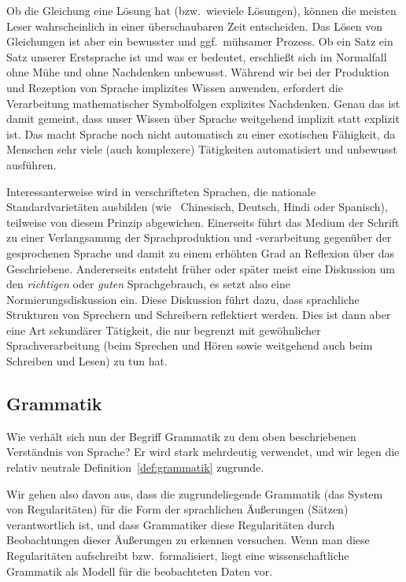 Ob die Gleichung eine Lösung hat (bzw.\ wieviele Lösungen), können die meisten Leser wahrscheinlich in einer überschaubaren Zeit entscheiden.
Das Lösen von Gleichungen ist aber ein bewusster und ggf.\ mühsamer Prozess.
Ob ein Satz ein Satz unserer Erstsprache ist und was er bedeutet, erschließt sich im Normalfall ohne Mühe und ohne Nachdenken unbewusst.
Während wir bei der Produktion und Rezeption von Sprache implizites Wissen anwenden, erfordert die Verarbeitung mathematischer Symbolfolgen explizites Nachdenken.
Genau das ist damit gemeint, dass unser Wissen über Sprache weitgehend implizit statt explizit ist.
Das macht Sprache noch nicht automatisch zu einer exotischen Fähigkeit, da Menschen sehr viele (auch komplexere) Tätigkeiten automatisiert und unbewusst ausführen.

Interessanterweise wird in verschrifteten Sprachen, die nationale Standardvarietäten ausbilden (wie \zB\ Chinesisch, Deutsch, Hindi oder Spanisch), teilweise von diesem Prinzip abgewichen. 
Einerseits führt das Medium der Schrift zu einer Verlangsamung der Sprachproduktion und -verarbeitung gegenüber der gesprochenen Sprache und damit zu einem erhöhten Grad an Reflexion über das Geschriebene.
Andererseits entsteht früher oder später meist eine Diskussion um den \textit{richtigen} oder \textit{guten} Sprachgebrauch, es setzt also eine Normierungsdiskussion ein. 
Diese Diskussion führt dazu, dass sprachliche Strukturen von Sprechern und Schreibern reflektiert werden.
Dies ist dann aber eine Art sekundärer Tätigkeit, die nur begrenzt mit gewöhnlicher Sprachverarbeitung (beim Sprechen und Hören sowie weitgehend auch beim Schreiben und Lesen) zu tun hat.

\subsection{Grammatik}

Wie verhält sich nun der Begriff Grammatik zu dem oben beschriebenen Verständnis von Sprache?
Er wird stark mehrdeutig verwendet, und wir legen die relativ neutrale Definition~\ref{def:grammatik} zugrunde.


Wir gehen also davon aus, dass die zugrundeliegende Grammatik (das System von Regularitäten) für die Form der sprachlichen Äußerungen (\zB Sätzen) verantwortlich ist, und dass Grammatiker diese Regularitäten durch Beobachtungen dieser Äußerungen zu erkennen versuchen.
Wenn man diese Regularitäten aufschreibt bzw.\ formalisiert, liegt eine wissenschaftliche Grammatik als Modell für die beobachteten Daten vor.

